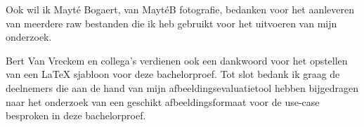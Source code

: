 Ook wil ik Mayté Bogaert, van MaytéB fotografie, bedanken voor het aanleveren van meerdere \gls{raw} bestanden die ik heb gebruikt voor het uitvoeren van mijn onderzoek.

Bert Van Vreckem en collega's verdienen ook een dankwoord voor het opstellen van een \LaTeX{} sjabloon voor deze bachelorproef. Tot slot bedank ik graag de deelnemers die aan de hand van mijn \gls{afbeeldingsevaluatietool} hebben bijgedragen naar het onderzoek van een geschikt \gls{afbeeldingsformaat} voor de \gls{use-case} besproken in deze bachelorproef.